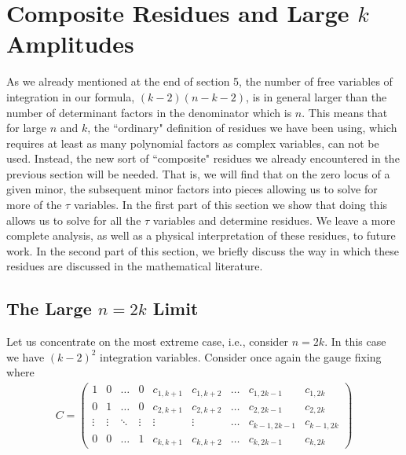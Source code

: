 \documentclass[12pt]{article}
\newcommand{\be}{\begin{eqnarray}}
\newcommand{\ee}{\end{eqnarray}}
\begin{document}
\section{Composite Residues and Large $k$ Amplitudes}

As we already mentioned at the end of section 5, the number of free
variables of integration in our formula, $(k-2)(n-k-2)$, is in
general larger than the number of determinant factors in the
denominator which is $n$. This means that for large $n$ and $k$, the
``ordinary" definition of residues we have been using, which
requires at least as many polynomial factors as complex variables,
can not be used. Instead, the new sort of ``composite" residues we
already encountered in the previous section will be needed. That is,
we will find that on the zero locus of a given minor, the subsequent
minor factors into pieces allowing us to solve for more of the
$\tau$ variables. In the first part of this section we show that
doing this allows us to solve for all the $\tau$ variables and
determine residues. We leave a more complete analysis, as well as a
physical interpretation of these residues, to future work. In the
second part of this section, we briefly discuss the way in which
these residues are discussed in the mathematical literature.

\subsection{The Large $n=2k$ Limit}

Let us concentrate on the most extreme case, i.e., consider $n=2k$. In this case we have $(k-2)^2$ integration variables. Consider once again the gauge fixing where
\be
C = \left(\begin{array}{ccccccccc} 1 & 0  & \ldots & 0 & c_{1,k+1} & c_{1,k+2} & \ldots & c_{1,2k-1} & c_{1,2k} \\ 0 & 1 & \ldots & 0 & c_{2,k+1} & c_{2,k+2} & \ldots & c_{2,2k-1} & c_{2,2k} \\ \vdots & \vdots &  \ddots & \vdots & \vdots & \vdots & \ldots & c_{k-1,2k-1} & c_{k-1,2k} \\ 0 & 0 & \ldots & 1 & c_{k,k+1} & c_{k,k+2} & \ldots & c_{k,2k-1} & c_{k,2k} \end{array} \right)
\ee
\end{document}
